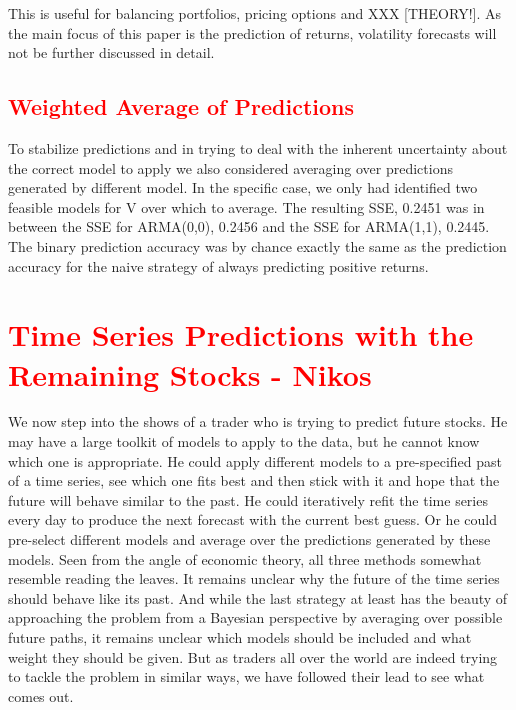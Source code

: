 This is useful for balancing portfolios, pricing options and XXX [THEORY!]. As the main focus of this paper is the prediction of returns, volatility forecasts will not be further discussed in detail. 

\subsection{\textcolor{red}{Weighted Average of Predictions}}
To stabilize predictions and in trying to deal with the inherent uncertainty about the correct model to apply we also considered averaging over predictions generated by different model. In the specific case, we only had identified two feasible models for V over which to average. The resulting SSE, 0.2451 was in between the SSE for ARMA(0,0), 0.2456 and the SSE for ARMA(1,1), 0.2445. The binary prediction accuracy was by chance exactly the same as the prediction accuracy for the naive strategy of always predicting positive returns. 

\section{\textcolor{red}{Time Series Predictions with the Remaining Stocks - Nikos}}

We now step into the shows of a trader who is trying to predict future stocks. He may have a large toolkit of models to apply to the data, but he cannot know which one is appropriate. He could apply different models to a pre-specified past of a time series, see which one fits best and then stick with it and hope that the future will behave similar to the past. He could iteratively refit the time series every day to produce the next forecast with the current best guess. Or he could pre-select different models and average over the predictions generated by these models. Seen from the angle of economic theory, all three methods somewhat resemble reading the leaves. It remains unclear why the future of the time series should behave like its past. And while the last strategy at least has the beauty of approaching the problem from a Bayesian perspective by averaging over possible future paths, it remains unclear which models should be included and what weight they should be given. But as traders all over the world are indeed trying to tackle the problem in similar ways, we have followed their lead to see what comes out. 


